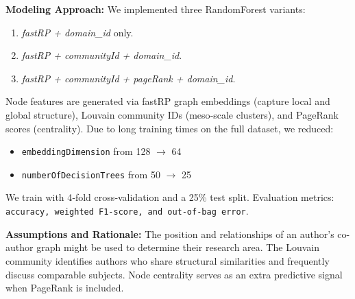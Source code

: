 \documentclass[conference]{IEEEtran}
\begin{document}
\noindent \textbf{\newline Modeling Approach:}
\newline
We implemented three RandomForest variants:
      \begin{enumerate}
        \item \emph{fastRP + domain\_id} only.
        \item \emph{fastRP + communityId + domain\_id}.
        \item \emph{fastRP + communityId + pageRank + domain\_id}.
      \end{enumerate}
Node features are generated via fastRP graph embeddings (capture local and global structure), Louvain community IDs (meso‐scale clusters), and PageRank scores (centrality). Due to long training times on the full dataset, we reduced:
      \begin{itemize}
        \item \texttt{embeddingDimension} from 128 \(\to\) 64  
        \item \texttt{numberOfDecisionTrees} from 50 \(\to\) 25  
      \end{itemize}
 We train with 4‑fold cross‑validation and a 25\% test split. Evaluation metrics: \texttt{accuracy, weighted F1‑score, and out‑of‑bag error}.

\noindent \textbf{\newline Assumptions and Rationale:}
\newline
The position and relationships of an author's co-author graph might be used to determine their research area.  The Louvain community identifies authors who share structural similarities and frequently discuss comparable subjects.  Node centrality serves as an extra predictive signal when PageRank is included.
\end{document}
